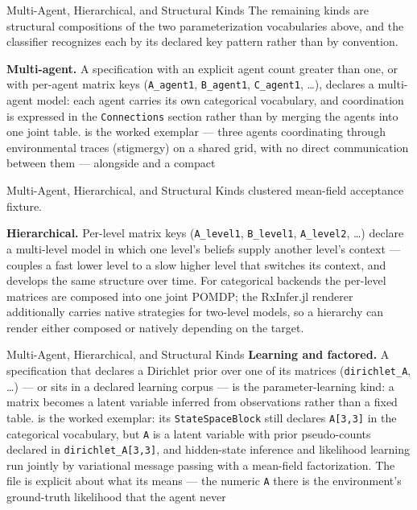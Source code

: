 \documentclass[
  ignorenonframetext,
]{beamer}
\begin{document}
\begin{frame}{Multi-Agent, Hierarchical, and
Structural Kinds}
\protect{}\label{sec:structural_variants}
The remaining kinds are structural compositions of the two
parameterization vocabularies above, and the classifier recognizes each
by its declared key pattern rather than by convention.

\textbf{Multi-agent.} A specification with an explicit agent count
greater than one, or with per-agent matrix keys (\texttt{A\_agent1},
\texttt{B\_agent1}, \texttt{C\_agent1}, \ldots), declares a multi-agent
model: each agent carries its own categorical vocabulary, and
coordination is expressed in the \texttt{Connections} section rather
than by merging the agents into one joint table.
 is the worked
exemplar --- three agents coordinating through environmental traces
(stigmergy) on a shared grid, with no direct communication between them
--- alongside  and a compact
\end{frame}

\begin{frame}{Multi-Agent, Hierarchical, and
Structural Kinds}
clustered mean-field acceptance fixture.

\textbf{Hierarchical.} Per-level matrix keys (\texttt{A\_level1},
\texttt{B\_level1}, \texttt{A\_level2}, \ldots) declare a multi-level
model in which one level's beliefs supply another level's context ---
 couples a
fast lower level to a slow higher level that switches its context, and
 develops the same structure over time.
For categorical backends the per-level matrices are composed into one
joint POMDP; the RxInfer.jl renderer additionally carries native
strategies for two-level models, so a hierarchy can render either
composed or natively depending on the target.

\end{frame}

\begin{frame}{Multi-Agent, Hierarchical, and
Structural Kinds}
\textbf{Learning and factored.} A specification that declares a
Dirichlet prior over one of its matrices (\texttt{dirichlet\_A}, \ldots)
--- or sits in a declared learning corpus --- is the parameter-learning
kind: a matrix becomes a latent variable inferred from observations
rather than a fixed table.
 is
the worked exemplar: its \texttt{StateSpaceBlock} still declares
\texttt{A{[}3,3{]}} in the categorical vocabulary, but \texttt{A} is a
latent variable with prior pseudo-counts declared in
\texttt{dirichlet\_A{[}3,3{]}}, and hidden-state inference and
likelihood learning run jointly by variational message passing with a
mean-field factorization. The file is explicit about what its
 means --- the numeric \texttt{A} there
is the environment's ground-truth likelihood that the agent never
\end{frame}
\end{document}
